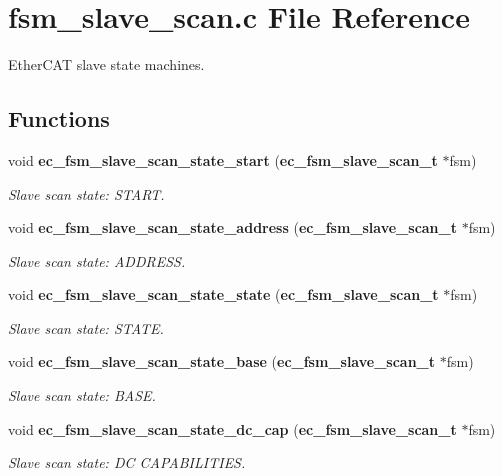 \section{fsm\-\_\-slave\-\_\-scan.\-c File Reference}
\label{fsm__slave__scan_8c}


Ether\-C\-A\-T slave state machines.  


\subsection*{Functions}
\begin{DoxyCompactItemize}
\item 
void {\bf ec\-\_\-fsm\-\_\-slave\-\_\-scan\-\_\-state\-\_\-start} ({\bf ec\-\_\-fsm\-\_\-slave\-\_\-scan\-\_\-t} $\ast$fsm)
\begin{DoxyCompactList}\small\item\em Slave scan state\-: S\-T\-A\-R\-T. \end{DoxyCompactList}\item 
void {\bf ec\-\_\-fsm\-\_\-slave\-\_\-scan\-\_\-state\-\_\-address} ({\bf ec\-\_\-fsm\-\_\-slave\-\_\-scan\-\_\-t} $\ast$fsm)
\begin{DoxyCompactList}\small\item\em Slave scan state\-: A\-D\-D\-R\-E\-S\-S. \end{DoxyCompactList}\item 
void {\bf ec\-\_\-fsm\-\_\-slave\-\_\-scan\-\_\-state\-\_\-state} ({\bf ec\-\_\-fsm\-\_\-slave\-\_\-scan\-\_\-t} $\ast$fsm)
\begin{DoxyCompactList}\small\item\em Slave scan state\-: S\-T\-A\-T\-E. \end{DoxyCompactList}\item 
void {\bf ec\-\_\-fsm\-\_\-slave\-\_\-scan\-\_\-state\-\_\-base} ({\bf ec\-\_\-fsm\-\_\-slave\-\_\-scan\-\_\-t} $\ast$fsm)
\begin{DoxyCompactList}\small\item\em Slave scan state\-: B\-A\-S\-E. \end{DoxyCompactList}\item 
void {\bf ec\-\_\-fsm\-\_\-slave\-\_\-scan\-\_\-state\-\_\-dc\-\_\-cap} ({\bf ec\-\_\-fsm\-\_\-slave\-\_\-scan\-\_\-t} $\ast$fsm)
\begin{DoxyCompactList}\small\item\em Slave scan state\-: D\-C C\-A\-P\-A\-B\-I\-L\-I\-T\-I\-E\-S. \end{DoxyCompactList}\item 

\end{DoxyCompactItemize}

